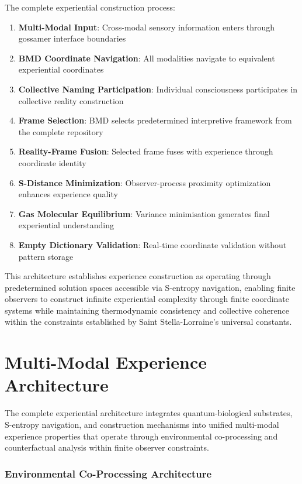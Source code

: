 \documentclass{article}
\begin{document}
The complete experiential construction process:
\begin{enumerate}
\item \textbf{Multi-Modal Input}: Cross-modal sensory information enters through gossamer interface boundaries
\item \textbf{BMD Coordinate Navigation}: All modalities navigate to equivalent experiential coordinates
\item \textbf{Collective Naming Participation}: Individual consciousness participates in collective reality construction 
\item \textbf{Frame Selection}: BMD selects predetermined interpretive framework from the complete repository
\item \textbf{Reality-Frame Fusion}: Selected frame fuses with experience through coordinate identity
\item \textbf{S-Distance Minimization}: Observer-process proximity optimization enhances experience quality
\item \textbf{Gas Molecular Equilibrium}: Variance minimisation generates final experiential understanding
\item \textbf{Empty Dictionary Validation}: Real-time coordinate validation without pattern storage
\end{enumerate}

This architecture establishes experience construction as operating through predetermined solution spaces accessible via S-entropy navigation, enabling finite observers to construct infinite experiential complexity through finite coordinate systems while maintaining thermodynamic consistency and collective coherence within the constraints established by Saint Stella-Lorraine's universal constants.

\section{Multi-Modal Experience Architecture}

The complete experiential architecture integrates quantum-biological substrates, S-entropy navigation, and construction mechanisms into unified multi-modal experience properties that operate through environmental co-processing and counterfactual analysis within finite observer constraints.

\subsubsection{Environmental Co-Processing Architecture}
\end{document}
